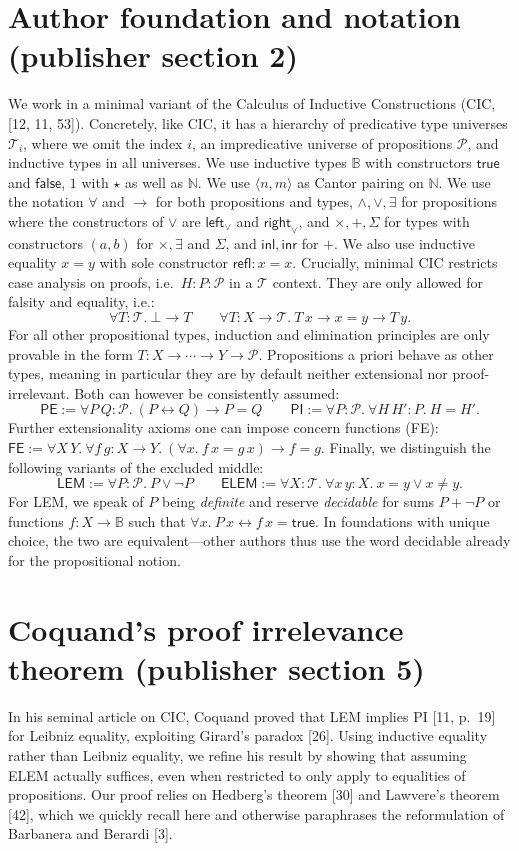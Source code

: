 \section*{Author foundation and notation (publisher section 2)}
We work in a minimal variant of the Calculus of Inductive Constructions (CIC, [12, 11, 53]).
Concretely, like CIC, it has a hierarchy of predicative type universes $\mathcal T_i$, where we omit the index $i$, an impredicative universe of propositions $\mathcal P$, and inductive types in all universes.
We use inductive types $\mathbb B$ with constructors $\mathsf{true}$ and $\mathsf{false}$, $1$ with $\star$ as well as $\mathbb N$.
We use $\langle n,m\rangle$ as Cantor pairing on $\mathbb N$.
We use the notation $\forall$ and $\to$ for both propositions and types,
$\land,\lor,\exists$ for propositions where the constructors of $\lor$ are $\mathsf{left}_{\lor}$ and $\mathsf{right}_{\lor}$, and $\times,+,\Sigma$ for types with constructors $(a,b)$ for $\times,\exists$ and $\Sigma$, and $\mathsf{inl},\mathsf{inr}$ for $+$.
We also use inductive equality $x=y$ with sole constructor $\mathsf{refl}:x=x$.
Crucially, minimal CIC restricts case analysis on proofs, i.e.\ $H:P:\mathcal P$ in a $\mathcal T$ context. They are only allowed for falsity and equality, i.e.:
\[
\forall T:\mathcal T.\ \bot\to T\qquad
\forall T:X\to\mathcal T.\ T\,x\to x=y\to T\,y.
\]
For all other propositional types, induction and elimination principles are only provable in the form $T:X\to\cdots\to Y\to\mathcal P$.
Propositions a priori behave as other types, meaning in particular they are by default neither extensional nor proof-irrelevant. Both can however be consistently assumed:
\[
\mathsf{PE}:=\forall P\,Q:\mathcal P.\ (P\leftrightarrow Q)\to P=Q
\qquad
\mathsf{PI}:=\forall P:\mathcal P.\ \forall H\,H':P.\ H=H'.
\]
Further extensionality axioms one can impose concern functions (FE): $\mathsf{FE}:=\forall X\,Y.\ \forall f\,g:X\to Y.\ (\forall x.\ f\,x=g\,x)\to f=g$.
Finally, we distinguish the following variants of the excluded middle:
\[
\mathsf{LEM}:=\forall P:\mathcal P.\ P\lor\neg P\qquad
\mathsf{ELEM}:=\forall X:\mathcal T.\ \forall x\,y:X.\ x=y\lor x\ne y.
\]
For LEM, we speak of $P$ being \emph{definite} and reserve \emph{decidable} for sums $P+\neg P$ or functions $f:X\to\mathbb B$ such that $\forall x.\ P\,x\leftrightarrow f\,x=\mathsf{true}$.
In foundations with unique choice, the two are equivalent---other authors thus use the word decidable already for the propositional notion.
\section*{Coquand's proof irrelevance theorem (publisher section 5)}
In his seminal article on CIC, Coquand proved that LEM implies PI [11, p.\ 19] for Leibniz equality, exploiting Girard's paradox [26]. Using inductive equality rather than Leibniz equality, we refine his result by showing that assuming ELEM actually suffices, even when restricted to only apply to equalities of propositions. Our proof relies on Hedberg's theorem [30] and Lawvere's theorem [42], which we quickly recall here and otherwise paraphrases the reformulation of Barbanera and Berardi [3].

